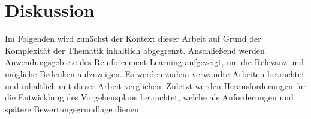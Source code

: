 \chapter{Diskussion} \label{chap:diskussion}
Im Folgenden wird zunächst der Kontext dieser Arbeit auf Grund der Komplexität der Thematik inhaltlich abgegrenzt.
Anschließend werden Anwendungsgebiete des Reinforcement Learning aufgezeigt, um die Relevanz und mögliche Bedenken aufzuzeigen.
Es werden zudem verwandte Arbeiten betrachtet und inhaltlich mit dieser Arbeit verglichen.
Zuletzt werden Herausforderungen für die Entwicklung des Vorgehensplans betrachtet, welche als Anforderungen und spätere Bewertungsgrundlage dienen.




